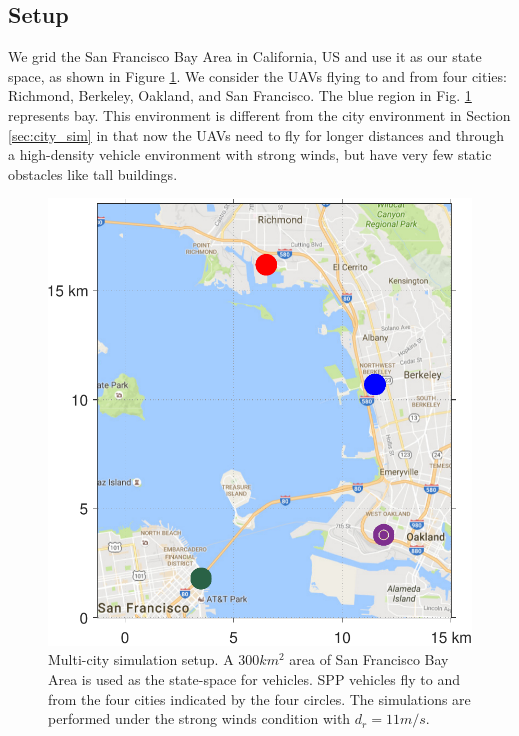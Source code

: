 \subsection{Setup \label{sec:bayArea_simSetup}}
We grid the San Francisco Bay Area in California, US and use it as our state space, as shown in Figure \ref{fig:bayArea_setup}. We consider the UAVs flying to and from four cities: Richmond, Berkeley, Oakland, and San Francisco. The blue region in Fig. \ref{fig:bayArea_setup} represents bay. This environment is different from the city environment in Section \ref{sec:city_sim} in that now the UAVs need to fly for longer distances and through a high-density vehicle environment with strong winds, but have very few static obstacles like tall buildings.    
%
\begin{figure}
  \centering
  \includegraphics[width=\columnwidth]{figs/bayArea_setup}
  \caption{Multi-city simulation setup. A $300 km^2$ area of San Francisco Bay Area is used as the state-space for vehicles. SPP vehicles fly to and from the four cities indicated by the four circles. The simulations are performed under the strong winds condition with $d_{r} = 11 m/s$.}
  \label{fig:bayArea_setup}
\end{figure}

